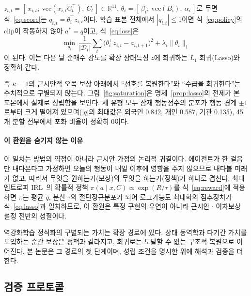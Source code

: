 \begin{proposition}[Lasso 환원]
\label{prop:lasso}
$z_{i,t}=[\,x_{i,t};\ \mathrm{vec}(x_{i,t}C_t^{\top});\ C_t\,]\in\mathbb{R}^{11}$,
$\theta_i=[\,\beta_i;\ \mathrm{vec}(B_i);\ \alpha_i\,]$로 두면
식~\eqref{eq:score}는 $q_{i,t}=\theta_i^{\top}z_{i,t}$이다. 학습 표본 전체에서
$|q_{i,t}|\le 1$이면 식~\eqref{eq:policy}의 clip이 작동하지 않아 $a^{*}=q$이고,
식~\eqref{eq:loss}은
\begin{equation}
\min_{\theta_i}\ \frac{1}{|\mathcal{D}_i|}
\sum_{t}\bigl(\theta_i^{\top}z_{i,t}-a_{i,t+1}\bigr)^{2}
+\lambda_i\lVert\theta_i\rVert_1
\label{eq:lasso}
\end{equation}
이 된다. 이는 다음 날 순매수 강도를 확장 상태특징 $z$에 회귀하는 $L_1$
회귀(Lasso)와 정확히 같다.
\end{proposition}

즉 $\kappa=1$의 근시안적 오목 보상 아래에서 ``선호를 복원한다''와 ``수급을
회귀한다''는 수치적으로 구별되지 않는다. 그림~\ref{fig:saturation}은
명제~\ref{prop:lasso}의 전제가 본 표본에서 실제로 성립함을 보인다. 세 유형 모두
잠재 행동점수의 분포가 행동 경계 $\pm1$로부터 크게 떨어져 있으며($|q|$의
최대값은 외국인 0.842, 개인 0.587, 기관 0.135), 45개 분할 전부에서 포화 비율이
정확히 0이다.

\paragraph{이 환원을 숨기지 않는 이유}
이 일치는 방법의 약점이 아니라 근시안 가정의 논리적 귀결이다. 에이전트가 한
걸음만 내다본다고 가정하면 오늘의 행동이 내일 이후에 영향을 주지 않으므로 내다볼
미래가 없고, 따라서 무엇을 원하는가(보상)와 무엇을 하는가(정책)가 하나로
겹친다. 최대엔트로피 IRL~\cite{ziebart2008maximum}의 확률적 정책
$\pi(a\mid x,C)\propto\exp(R/\tau)$를 식~\eqref{eq:reward}에 적용하면 $\pi$는
평균 $q$, 분산 $\tau$의 절단정규분포가 되어 로그가능도 최대화의 점추정치가
식~\eqref{eq:lasso}과 일치하므로, 이 환원은 특정 구현의 우연이 아니라
근시안ㆍ이차보상 설정 전반의 성질이다.

역강화학습 정식화의 구별되는 가치는 확장 경로에 있다. 상태 동역학과 다기간
가치를 도입하는 순간 보상은 정책과 갈라지고, 회귀로는 도달할 수 없는 구조적
복원으로 이어진다. 본 논문은 그 경로의 첫 단계이며, 성립 조건을 명시한 위에
해석과 검증을 더한다.

\subsection{검증 프로토콜}
\label{sec:protocol}

